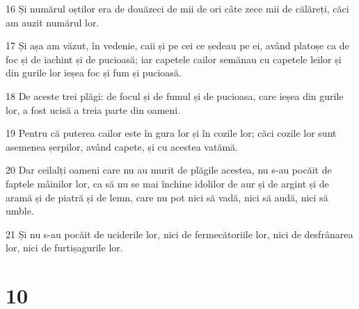 \par 16 Și numărul oștilor era de douăzeci de mii de ori câte zece mii de călăreți, căci am auzit numărul lor.
\par 17 Și așa am văzut, în vedenie, caii și pe cei ce ședeau pe ei, având platoșe ca de foc și de iachint și de pucioasă; iar capetele cailor semănau cu capetele leilor și din gurile lor ieșea foc și fum și pucioasă.
\par 18 De aceste trei plăgi: de focul și de fumul și de pucioasa, care ieșea din gurile lor, a fost ucisă a treia parte din oameni.
\par 19 Pentru că puterea cailor este în gura lor și în cozile lor; căci cozile lor sunt asemenea șerpilor, având capete, și cu acestea vatămă.
\par 20 Dar ceilalți oameni care nu au murit de plăgile acestea, nu s-au pocăit de faptele mâinilor lor, ca să nu se mai închine idolilor de aur și de argint și de aramă și de piatră și de lemn, care nu pot nici să vadă, nici să audă, nici să umble.
\par 21 Și nu s-au pocăit de uciderile lor, nici de fermecătoriile lor, nici de desfrânarea lor, nici de furtișagurile lor.

\chapter{10}


